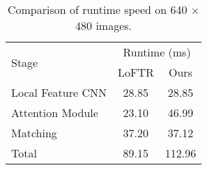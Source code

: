 \begin{table}[h]
    \begin{center}
    \begin{tabular}{lcc}
    \hline \multirow{2}{*}{ Stage } & \multicolumn{2}{c}{ Runtime (ms) } \\
    \cline { 2 - 3 } & LoFTR & \hspace{1cm} Ours \\
    \hline Local Feature CNN \hspace{1cm} &  28.85 & \hspace{1cm} 28.85 \\
    Attention Module & 23.10 & \hspace{1cm}46.99 \\
    Matching & 37.20 & \hspace{1cm}37.12 \\
    Total & 89.15 & \hspace{1cm}112.96 \\
    \hline
    \end{tabular}
    \caption{Comparison of runtime speed on 640 $\times$ 480 images.}
    \label{tab:timing_our}
    \end{center}
\end{table}